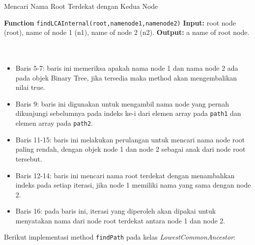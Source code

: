 \begin{minipage}{.8\linewidth}
\begin{algorithm}[H]
  \caption{Mencari Nama Root Terdekat dengan Kedua Node}\label{alg:5}
  \begin{algorithmic}[1]
  \State \textbf{Function} \texttt{findLCAInternal(root,namenode1,namenode2)}
  \State \textbf{Input:} root node (root), name of node 1 (n1), name of node 2 (n2).
  \State \textbf{Output:} a name of root node.
  \\
  \EndIf
  \\
  \\
  	\EndIf
  \EndWhile
  \end{algorithmic}
\end{algorithm}
\end{minipage}

\vspace{0.2cm}
\begin{itemize}
\item Baris 5-7: baris ini memeriksa apakah nama node 1 dan nama node 2 ada pada objek Binary Tree, jika tersedia maka method akan mengembalikan nilai true.
\item Baris 9: baris ini digunakan untuk mengambil nama node yang pernah dikunjungi sebelumnya pada indeks ke-i dari elemen array pada \texttt{path1} dan elemen array pada \texttt{path2}.
\item Baris 11-15: baris ini melakukan perulangan untuk mencari nama node root paling rendah, dengan objek node 1 dan node 2 sebagai anak dari node root tersebut. 
\item Baris 12-14: baris ini mencari nama root terdekat dengan menambahkan indeks pada setiap iterasi, jika node 1 memiliki nama yang sama dengan node 2.
\item Baris 16: pada baris ini, iterasi yang diperoleh akan dipakai untuk menyatakan nama dari node root terdekat antara node 1 dan node 2.
\end{itemize}

\noindent Berikut implementasi method \texttt{findPath} pada kelas \textit{LowestCommonAncestor}:

